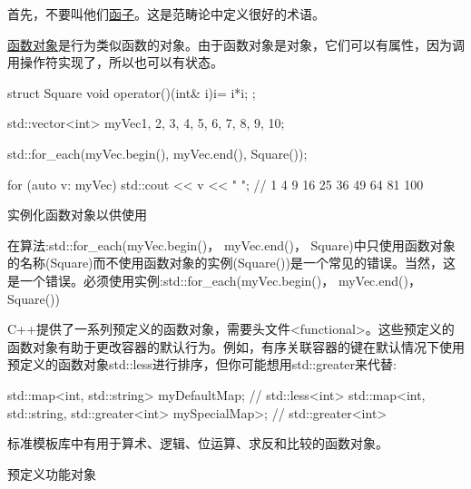 首先，不要叫他们\href{https://en.wikipedia.org/wiki/Functor}{函子}。这是范畴论中定义很好的术语。

\href{http://en.cppreference.com/w/cpp/utility/functional}{函数对象}是行为类似函数的对象。由于函数对象是对象，它们可以有属性，因为调用操作符实现了，所以也可以有状态。

\begin{cpp}
struct Square{
	void operator()(int& i){i= i*i;}
};

std::vector<int> myVec{1, 2, 3, 4, 5, 6, 7, 8, 9, 10};

std::for_each(myVec.begin(), myVec.end(), Square());

for (auto v: myVec) std::cout << v << " "; // 1 4 9 16 25 36 49 64 81 100
\end{cpp}

\begin{myTip}{实例化函数对象以供使用}
	
在算法:std::for\_each(myVec.begin()， myVec.end()， Square)中只使用函数对象的名称(Square)而不使用函数对象的实例(Square())是一个常见的错误。当然，这是一个错误。必须使用实例:std::for\_each(myVec.begin()， myVec.end()， Square())
\end{myTip}


C++提供了一系列预定义的函数对象，需要头文件<functional>。这些预定义的函数对象有助于更改容器的默认行为。例如，有序关联容器的键在默认情况下使用预定义的函数对象std::less进行排序，但你可能想用std::greater来代替:

\begin{cpp}
std::map<int, std::string> myDefaultMap; // std::less<int>
std::map<int, std::string, std::greater<int> mySpecialMap>; // std::greater<int>
\end{cpp}

标准模板库中有用于算术、逻辑、位运算、求反和比较的函数对象。

\begin{center}
预定义功能对象
\end{center}

